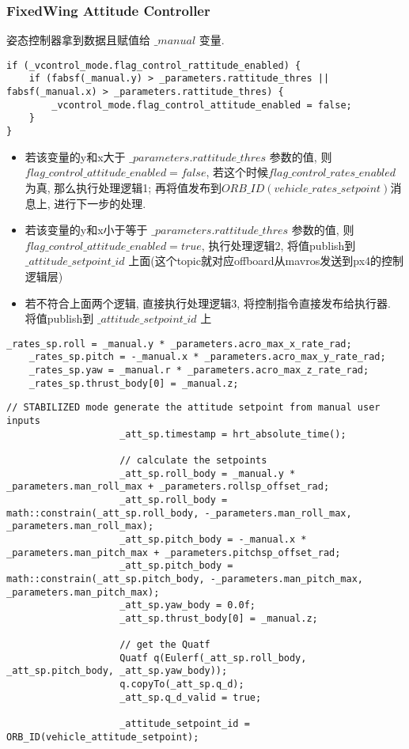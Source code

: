 \subsubsection{FixedWing Attitude Controller}
姿态控制器拿到数据且赋值给 $\_manual$ 变量.
\begin{lstlisting}[title=高度处理逻辑]
if (_vcontrol_mode.flag_control_rattitude_enabled) {
	if (fabsf(_manual.y) > _parameters.rattitude_thres || fabsf(_manual.x) > _parameters.rattitude_thres) {
		_vcontrol_mode.flag_control_attitude_enabled = false;
	}
}
\end{lstlisting}
\par
\begin{itemize}
    \item 若该变量的y和x大于 $\_parameters.rattitude\_thres$ 参数的值, 则 $flag\_control\_attitude\_enabled = false$, 若这个时候$flag\_control\_rates\_enabled$ 为真, 那么执行处理逻辑1; 再将值发布到$ORB\_ID(vehicle\_rates\_setpoint)$消息上, 进行下一步的处理.
    \item 若该变量的y和x小于等于 $\_parameters.rattitude\_thres$ 参数的值, 则 $flag\_control\_attitude\_enabled = true$, 执行处理逻辑2, 将值publish到 $\_attitude\_setpoint\_id$ 上面(这个topic就对应offboard从mavros发送到px4的控制逻辑层)
    \item 若不符合上面两个逻辑, 直接执行处理逻辑3, 将控制指令直接发布给执行器. 将值publish到 $\_attitude\_setpoint\_id$ 上
\end{itemize}
\begin{lstlisting}[title=处理逻辑1]  
    _rates_sp.roll = _manual.y * _parameters.acro_max_x_rate_rad;
    _rates_sp.pitch = -_manual.x * _parameters.acro_max_y_rate_rad;
    _rates_sp.yaw = _manual.r * _parameters.acro_max_z_rate_rad;
    _rates_sp.thrust_body[0] = _manual.z;        
\end{lstlisting}
\begin{lstlisting}[title=处理逻辑2]  
    // STABILIZED mode generate the attitude setpoint from manual user inputs
					_att_sp.timestamp = hrt_absolute_time();

					// calculate the setpoints 
					_att_sp.roll_body = _manual.y * _parameters.man_roll_max + _parameters.rollsp_offset_rad;
					_att_sp.roll_body = math::constrain(_att_sp.roll_body, -_parameters.man_roll_max, _parameters.man_roll_max);
					_att_sp.pitch_body = -_manual.x * _parameters.man_pitch_max + _parameters.pitchsp_offset_rad;
					_att_sp.pitch_body = math::constrain(_att_sp.pitch_body, -_parameters.man_pitch_max, _parameters.man_pitch_max);
					_att_sp.yaw_body = 0.0f;
					_att_sp.thrust_body[0] = _manual.z;

					// get the Quatf
					Quatf q(Eulerf(_att_sp.roll_body, _att_sp.pitch_body, _att_sp.yaw_body));
					q.copyTo(_att_sp.q_d);
                    _att_sp.q_d_valid = true;  
                    
                    _attitude_setpoint_id = ORB_ID(vehicle_attitude_setpoint);
\end{lstlisting}

